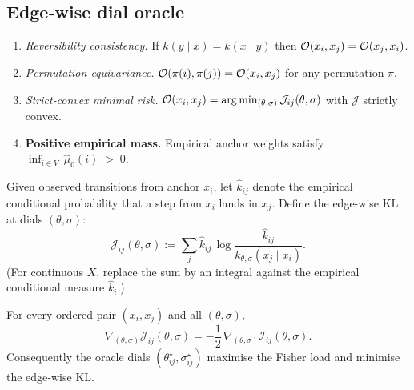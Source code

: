	\subsection{Edge‑wise dial oracle}  %
		\begin{assumptionbox}[frametitle={Oracle axioms}]
			\begin{enumerate}[label=\textbf{(A\arabic*)},leftmargin=*]
 		 		\item \emph{Reversibility consistency.}
       					If $k(y\mid x)=k(x\mid y)$ then ${\cal O}(x_i,x_j)={\cal O}(x_j,x_i)$.
 	 			\item \emph{Permutation equivariance.}
      					${\cal O}(\pi(i),\pi(j))={\cal O}(x_i,x_j)$ for any permutation $\pi$.
  				\item \emph{Strict‑convex minimal risk.}
        					${\cal O}(x_i,x_j)=\arg\min_{(\theta,\sigma)}\mathcal J_{ij}(\theta,\sigma)$ with $\mathcal J$ strictly convex.
				\item\label{A4}\textbf{Positive empirical mass.}  
      					Empirical anchor weights satisfy $\displaystyle\inf_{i\in V}\,\widehat{\mu}_0(i)\;>\;0$.
			\end{enumerate}
		\end{assumptionbox}
		
		\begin{definition}\label{def:edge-KL}
			Given observed transitions from anchor $x_i$,
			let $\widehat{k}_{ij}$ denote the empirical conditional probability that
			a step from $x_i$ lands in $x_j$.
			Define the edge-wise KL at dials $(\theta,\sigma)$:
			\[
  				\mathcal J_{ij}(\theta,\sigma)
  				:=
  				\sum_{j}
    				\widehat{k}_{ij}\,
    				\log\frac{\widehat{k}_{ij}}{k_{\theta,\sigma}(x_j\mid x_i)}.
			\]
			(For continuous $X$, replace the sum by an integral against the
			empirical conditional measure $\widehat{k}_{i}$.)
		\end{definition}
		
		\begin{proposition}\label{prop:edgeKLgrad}
			For every ordered pair $(x_i,x_j)$ and all $(\theta,\sigma)$,
			\[
  				\nabla_{(\theta,\sigma)}
  				\mathcal J_{ij}(\theta,\sigma)
  				= -\frac12\,
    				\nabla_{(\theta,\sigma)}
    				\mathcal I_{ij}(\theta,\sigma).
			\]
			Consequently the oracle dials
			$(\theta^{\star}_{ij},\sigma^{\star}_{ij})$ maximise the Fisher load
			and minimise the edge‑wise KL.
		\end{proposition}


